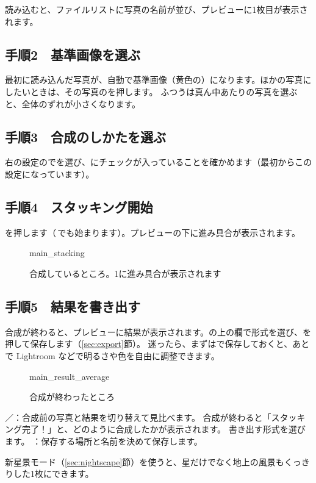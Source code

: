 読み込むと、ファイルリストに写真の名前が並び、プレビューに1枚目が表示されます。

\subsection*{手順2　基準画像を選ぶ}

最初に読み込んだ写真が、自動で基準画像（黄色の）になります。ほかの写真にしたいときは、その写真のを押します。
ふつうは真ん中あたりの写真を選ぶと、全体のずれが小さくなります。

\subsection*{手順3　合成のしかたを選ぶ}

右の設定のでを選び、にチェックが入っていることを確かめます（最初からこの設定になっています）。

\subsection*{手順4　スタッキング開始}

を押します（\,でも始まります）。プレビューの下に進み具合が表示されます。

\begin{figure}[H]
\centering
\begin{screenshot}{main_stacking}
\end{screenshot}
\caption{合成しているところ。\num{1}に進み具合が表示されます}
\end{figure}

\subsection*{手順5　結果を書き出す}

合成が終わると、プレビューに結果が表示されます。の上の欄で形式を選び、を押して保存します（\ref{sec:export}節）。
迷ったら、まずはで保存しておくと、あとで Lightroom などで明るさや色を自由に調整できます。

\begin{figure}[H]
\centering
\begin{screenshot}{main_result_average}
\end{screenshot}
\caption{合成が終わったところ}
\end{figure}

\begin{callouts}
 ／：合成前の写真と結果を切り替えて見比べます。
 合成が終わると「スタッキング完了！」と、どのように合成したかが表示されます。
 書き出す形式を選びます。
 ：保存する場所と名前を決めて保存します。
\end{callouts}

\begin{hint}[うまくいったら]
新星景モード（\ref{sec:nightscape}節）を使うと、星だけでなく地上の風景もくっきりした1枚にできます。
\end{hint}

